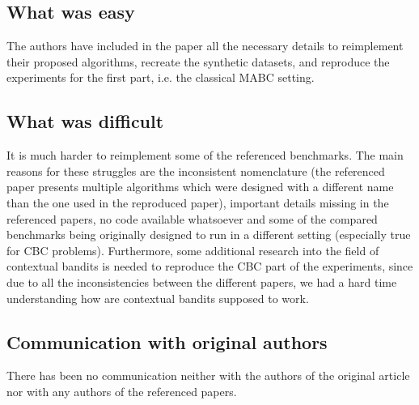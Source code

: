 \subsection{What was easy}

The authors have included in the paper all the necessary details to reimplement their proposed algorithms, recreate the synthetic datasets, and reproduce the experiments for the first part, i.e. the classical MABC setting.

\subsection{What was difficult}

It is much harder to reimplement some of the referenced benchmarks. The main reasons for these struggles are the inconsistent nomenclature (the referenced paper presents multiple algorithms which were designed with a different name than the one used in the reproduced paper), important details missing in the referenced papers, no code available whatsoever and some of the compared benchmarks being originally designed to run in a different setting (especially true for CBC problems). Furthermore, some additional research into the field of contextual bandits is needed to reproduce the CBC part of the experiments, since due to all the inconsistencies between the different papers, we had a hard time understanding how are contextual bandits supposed to work.

\subsection{Communication with original authors}

There has been no communication neither with the authors of the original article nor with any authors of the referenced papers.
